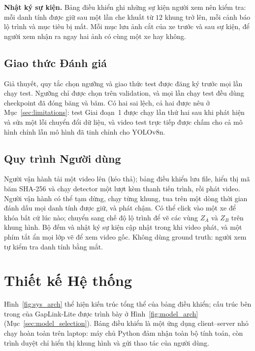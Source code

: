 \textbf{Nhật ký sự kiện.} Bảng điều khiển ghi những sự kiện người xem nên kiểm tra: mỗi danh tính được giữ sau một lần che khuất từ $12$ khung trở lên, mỗi cảnh báo lộ trình và mục tiêu bị mất. Mỗi mục lưu ảnh cắt của xe trước và sau sự kiện, để người xem nhận ra ngay hai ảnh có cùng một xe hay không.

\subsection{Giao thức Đánh giá}
\label{sec:eval_protocol}

Giả thuyết, quy tắc chọn ngưỡng và giao thức test được đăng ký trước mọi lần chạy test. Ngưỡng chỉ được chọn trên validation, và mọi lần chạy test đều dùng checkpoint đã đóng băng và băm. Có hai sai lệch, cả hai được nêu ở Mục~\ref{sec:limitations}: test Giai đoạn~1 được chạy lần thứ hai sau khi phát hiện và sửa một lỗi chuyển đổi dữ liệu, và video test trực tiếp được chấm cho cả mô hình chính lẫn mô hình đã tinh chỉnh cho YOLOv8n.

\subsection{Quy trình Người dùng}
\label{sec:user_workflow}

Người vận hành tải một video lên (kéo thả); bảng điều khiển lưu file, hiển thị mã băm SHA-256 và chạy detector một lượt kèm thanh tiến trình, rồi phát video. Người vận hành có thể tạm dừng, chạy từng khung, tua trên một dòng thời gian đánh dấu mọi danh tính được giữ, và phát chậm. Có thể click vào một xe để khóa bất cứ lúc nào; chuyển sang chế độ lộ trình để vẽ các vùng $Z_A$ và $Z_B$ trên khung hình. Bộ đếm và nhật ký sự kiện cập nhật trong khi video phát, và một phím tắt ẩn mọi lớp vẽ để xem video gốc. Không dùng ground truth: người xem tự kiểm tra danh tính bằng mắt.

\section{Thiết kế Hệ thống}
\label{sec:system_design}

Hình~\ref{fig:sys_arch} thể hiện kiến trúc tổng thể của bảng điều khiển; cấu trúc bên trong của GapLink-Lite được trình bày ở Hình~\ref{fig:model_arch} (Mục~\ref{sec:model_selection}). Bảng điều khiển là một ứng dụng client--server nhỏ chạy hoàn toàn trên laptop: máy chủ Python đảm nhận toàn bộ tính toán, còn trình duyệt chỉ hiển thị khung hình và gửi thao tác của người dùng.


